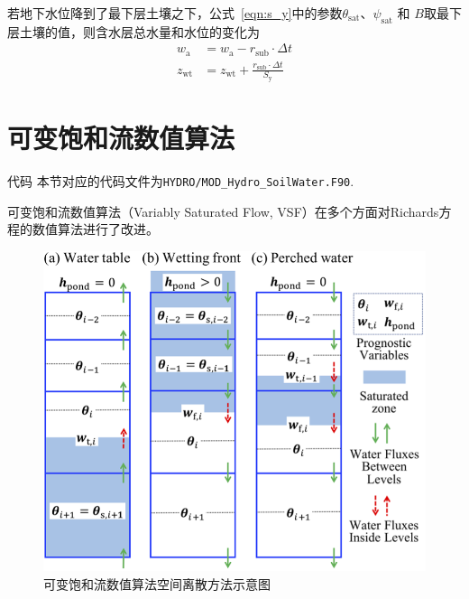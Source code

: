 若地下水位降到了最下层土壤之下，公式~\eqref{eqn:s_y}中的参数$\theta_{\mathrm {sat}} $、$\psi_{\mathrm {sat}} $ 和 $B$取最下层土壤的值，则含水层总水量和水位的变化为
\begin{equation}
  \begin{aligned}
    w_{\mathrm{a}} & = w_{\mathrm{a}} - r_{\mathrm{sub}} \cdot \Delta t \\
    z_{\mathrm{wt}} & = z_{\mathrm{w t}}+\frac{r_{\mathrm{sub}} \cdot \Delta t}{S_{\mathrm{y}}}
  \end{aligned}
\end{equation}

\section{可变饱和流数值算法}

\begin{mymdframed}{代码}
  本节对应的代码文件为\texttt{HYDRO/MOD\_Hydro\_SoilWater.F90}.
\end{mymdframed}

可变饱和流数值算法（Variably Saturated Flow, VSF）\citep{dai2019vsf}在多个方面对Richards方程的数值算法进行了改进。

{
  \begin{figure}[htbp]
    \centering
    \includegraphics{Figures/陆地表面的水分循环/可变饱和流数值算法预报区域空间结构示意图.png}
    \caption{可变饱和流数值算法空间离散方法示意图}
    \label{fig:可变饱和流数值算法预报区域空间结构示意图}
  \end{figure}
}

